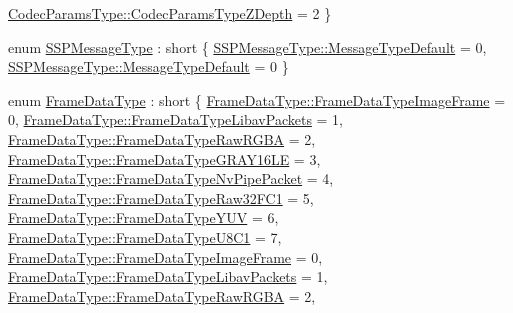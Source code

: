 \begin{DoxyCompactItemize}
\hyperlink{namespacemoetsi_1_1ssp_a6d638ba0bd38e9daded08f633d893563a4e738f8ec62ed2fd5d5675f71b291992}{Codec\+Params\+Type\+::\+Codec\+Params\+Type\+Z\+Depth} = 2
 \}
\item 
enum \hyperlink{namespacemoetsi_1_1ssp_a8948545ffe48a5b3507fd10a1e56d546}{S\+S\+P\+Message\+Type} \+: short \{ \hyperlink{namespacemoetsi_1_1ssp_a8948545ffe48a5b3507fd10a1e56d546a16d065ca1ae16532bc3115ec68734080}{S\+S\+P\+Message\+Type\+::\+Message\+Type\+Default} = 0, 
\hyperlink{namespacemoetsi_1_1ssp_a8948545ffe48a5b3507fd10a1e56d546a16d065ca1ae16532bc3115ec68734080}{S\+S\+P\+Message\+Type\+::\+Message\+Type\+Default} = 0
 \}
\item 
enum \hyperlink{namespacemoetsi_1_1ssp_aa9b059f0bc7a91855545ee887f2d56c4}{Frame\+Data\+Type} \+: short \{ \newline
\hyperlink{namespacemoetsi_1_1ssp_aa9b059f0bc7a91855545ee887f2d56c4a6f466822a5d24eab84554c0bf415903d}{Frame\+Data\+Type\+::\+Frame\+Data\+Type\+Image\+Frame} = 0, 
\hyperlink{namespacemoetsi_1_1ssp_aa9b059f0bc7a91855545ee887f2d56c4a234b11a09d69865a40eb4db132fe7096}{Frame\+Data\+Type\+::\+Frame\+Data\+Type\+Libav\+Packets} = 1, 
\hyperlink{namespacemoetsi_1_1ssp_aa9b059f0bc7a91855545ee887f2d56c4ac2cdf85544553bda5453b401b79964eb}{Frame\+Data\+Type\+::\+Frame\+Data\+Type\+Raw\+R\+G\+BA} = 2, 
\hyperlink{namespacemoetsi_1_1ssp_aa9b059f0bc7a91855545ee887f2d56c4a44d909233498ad3dec5a3e3e95e908ca}{Frame\+Data\+Type\+::\+Frame\+Data\+Type\+G\+R\+A\+Y16\+LE} = 3, 
\newline
\hyperlink{namespacemoetsi_1_1ssp_aa9b059f0bc7a91855545ee887f2d56c4a1628ff13722acd71d3e90b51c8faa31c}{Frame\+Data\+Type\+::\+Frame\+Data\+Type\+Nv\+Pipe\+Packet} = 4, 
\hyperlink{namespacemoetsi_1_1ssp_aa9b059f0bc7a91855545ee887f2d56c4abb6735708adc6efcecf59e0e1e6c9387}{Frame\+Data\+Type\+::\+Frame\+Data\+Type\+Raw32\+F\+C1} = 5, 
\hyperlink{namespacemoetsi_1_1ssp_aa9b059f0bc7a91855545ee887f2d56c4a6191c61c70f47aa00e2f9251d8ad59fa}{Frame\+Data\+Type\+::\+Frame\+Data\+Type\+Y\+UV} = 6, 
\hyperlink{namespacemoetsi_1_1ssp_aa9b059f0bc7a91855545ee887f2d56c4acd5fc2d48d13ef44a9806046ae34d56b}{Frame\+Data\+Type\+::\+Frame\+Data\+Type\+U8\+C1} = 7, 
\newline
\hyperlink{namespacemoetsi_1_1ssp_aa9b059f0bc7a91855545ee887f2d56c4a6f466822a5d24eab84554c0bf415903d}{Frame\+Data\+Type\+::\+Frame\+Data\+Type\+Image\+Frame} = 0, 
\hyperlink{namespacemoetsi_1_1ssp_aa9b059f0bc7a91855545ee887f2d56c4a234b11a09d69865a40eb4db132fe7096}{Frame\+Data\+Type\+::\+Frame\+Data\+Type\+Libav\+Packets} = 1, 
\hyperlink{namespacemoetsi_1_1ssp_aa9b059f0bc7a91855545ee887f2d56c4ac2cdf85544553bda5453b401b79964eb}{Frame\+Data\+Type\+::\+Frame\+Data\+Type\+Raw\+R\+G\+BA} = 2, 

\end{DoxyCompactItemize}
